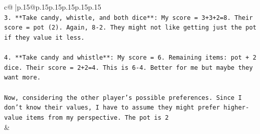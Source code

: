 \documentclass{article}
\begin{document}
{\begin{supertabular}{c@{$\;$}|p{.15\linewidth}@{}p{.15\linewidth}p{.15\linewidth}p{.15\linewidth}p{.15\linewidth}p{.15\linewidth}}
{{{\\ 
\texttt{3. **Take candy, whistle, and both dice**: My score = 3+3+2=8. Their score = pot (2). Again, 8{-}2. They might not like getting just the pot if they value it less.} \\
\\ 
\texttt{4. **Take candy and whistle**: My score = 6. Remaining items: pot + 2 dice. Their score = 2+2=4. This is 6{-}4. Better for me but maybe they want more.} \\
\\ 
\texttt{Now, considering the other player's possible preferences. Since I don't know their values, I have to assume they might prefer higher{-}value items from my perspective. The pot is 2} \\
            }
        }
    }
    & \\ \\


\end{supertabular}}
\end{document}
